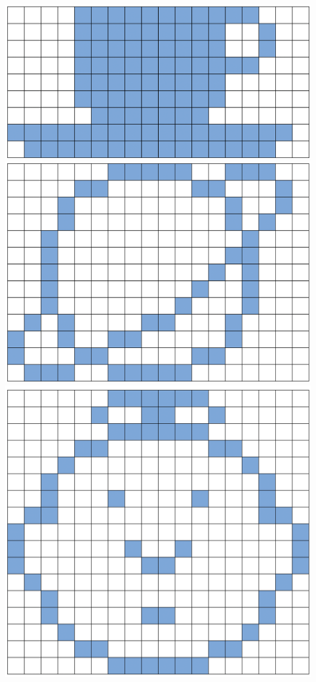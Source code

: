 \documentclass[]{article}
\begin{document}
\includegraphics{csunplugged/01-part/img/ch02-img/02-image-06-hint-solution-01.png}
\includegraphics{csunplugged/01-part/img/ch02-img/02-image-06-hint-solution-02.png}
\includegraphics{csunplugged/01-part/img/ch02-img/02-image-06-hint-solution-03.png}
\end{document}
